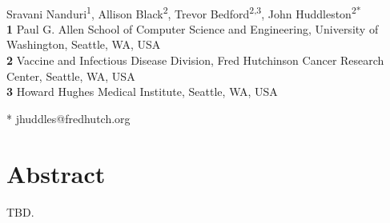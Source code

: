 \documentclass[10pt,letterpaper]{article}
\begin{document}
\vspace*{0.2in}

\begin{flushleft}
{\Large
\textbf{} %
}
\newline
\\
Sravani Nanduri\textsuperscript{1},
Allison Black\textsuperscript{2},
Trevor Bedford\textsuperscript{2,3},
John Huddleston\textsuperscript{2*}
\\
\bigskip
\textbf{1} Paul G. Allen School of Computer Science and Engineering, University of Washington, Seattle, WA, USA
\\
\textbf{2} Vaccine and Infectious Disease Division, Fred Hutchinson Cancer Research Center, Seattle, WA, USA
\\
\textbf{3} Howard Hughes Medical Institute, Seattle, WA, USA
\\
\bigskip

%
%





* jhuddles@fredhutch.org

\end{flushleft}
\section*{Abstract}
TBD.
\end{document}
